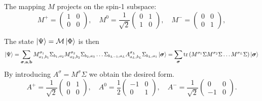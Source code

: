 \documentclass[a4paper,10pt,twoside]{article}
\DeclareMathOperator{\trace}{tr}
\begin{document}
\begin{section}{}
The mapping $M$ projects on the spin-1 subspace:
\[
  M^+=
  \begin{pmatrix}
    1 & 0\\
    0 & 0
  \end{pmatrix}, \quad
  M^0=\frac{1}{\sqrt{2}}
  \begin{pmatrix}
    0 & 1\\
    1 & 0
  \end{pmatrix}, \quad
  M^-=
  \begin{pmatrix}
    0 & 0\\
    0 & 1
  \end{pmatrix},
\]
\end{section}
The state $\ket{\Psi} = \mathcal{M} \ket{\Phi}$ is then 
\[
  \ket{\Psi} = \sum_{\boldsymbol{\sigma},\mathbf{a},\mathbf{b}} M^{\sigma_1}_{a_1,b_1} \Sigma_{b_1,a_2} M^{\sigma_2}_{a_2,b_2} \Sigma_{b_2,a_3} \dots \Sigma_{b_{L-1},a_L} A^{\sigma_L}_{a_L,b_L}  \Sigma_{b_L,a_1} \ket{\boldsymbol{\sigma}}
  = \sum_{\boldsymbol{\sigma}} \trace{\left(M^{\sigma_1} \Sigma M^{\sigma_2} \Sigma \dots M^{\sigma_L} \Sigma \right)} \ket{\boldsymbol{\sigma}}
\]
By introducing $A^\sigma = M^\sigma \Sigma$ we obtain the desired form.
\[
  A^+=\frac{1}{\sqrt{2}}
  \begin{pmatrix}
    0 & 1\\
    0 & 0
  \end{pmatrix}, \quad
  A^0=\frac{1}{2}
  \begin{pmatrix}
    -1 & 0\\
    0 & 1
  \end{pmatrix}, \quad
  A^-=\frac{1}{\sqrt{2}}
  \begin{pmatrix}
    0 & 0\\
    -1 & 0
  \end{pmatrix}.
\]
\end{document}
